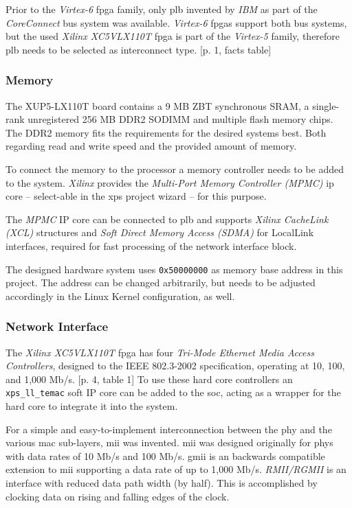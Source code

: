 Prior to the \textit{Virtex-6} \gls{fpga} family, only \gls{plb} invented by \textit{IBM} as part of the \textit{CoreConnect} bus system was available. \textit{Virtex-6} \gls{fpga}s support both bus systems, but the used \textit{Xilinx XC5VLX110T} \gls{fpga} is part of the \textit{Virtex-5} family, therefore \gls{plb} needs to be selected as interconnect type. \cite{axi_interconnect}[p. 1, facts table]

\subsubsection{Memory}

The XUP5-LX110T board contains a 9 MB ZBT synchronous SRAM, a single-rank unregistered 256 MB DDR2 SODIMM and multiple flash memory chips. The DDR2 memory fits the requirements for the desired systems best. Both regarding read and write speed and the provided amount of memory.

To connect the memory to the processor a memory controller needs to be added to the system.  \textit{Xilinx} provides the \textit{Multi-Port Memory Controller (MPMC)} \gls{ip} core -- select-able in the \gls{xps} project wizard -- for this purpose.

The \textit{MPMC} IP core can be connected to \gls{plb} and supports \textit{Xilinx CacheLink (XCL)} structures and \textit{Soft Direct Memory Access (SDMA)} for LocalLink interfaces, required for fast processing of the network interface block. \cite{mpmc}

The designed hardware system uses \texttt{0x50000000} as memory base address in this project. The address can be changed arbitrarily, but needs to be adjusted accordingly in the Linux Kernel configuration, as well.

\subsubsection{Network Interface}

The \textit{Xilinx XC5VLX110T} \gls{fpga} has four \textit{Tri-Mode Ethernet Media Access Controllers}, designed to the IEEE 802.3-2002 specification, operating at 10, 100, and 1,000 Mb/s. \cite{virtex5}[p. 4, table 1] To use these hard core controllers an \texttt{xps\_ll\_temac} soft IP core can be added to the \gls{soc}, acting as a wrapper for the hard core to integrate it into the system.

For a simple and easy-to-implement interconnection between the \gls{phy} and the various \gls{mac} sub-layers, \gls{mii} was invented. \gls{mii} was designed originally for \gls{phy}s with data rates of 10 Mb/s and 100 Mb/s. \gls{gmii} is an backwards compatible extension to \gls{mii} supporting a data rate of up to 1,000 Mb/s. \textit{RMII/RGMII} is an interface with reduced data path width (by half). This is accomplished by clocking data on rising and falling edges of the clock.

